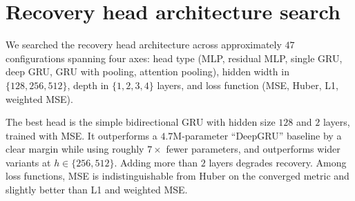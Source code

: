 \section{Recovery head architecture search}
\label{sec:appendix-head-search}

We searched the recovery head architecture across approximately $47$
configurations spanning four axes: head type (MLP, residual MLP,
single GRU, deep GRU, GRU with pooling, attention pooling), hidden
width in $\{128, 256, 512\}$, depth in $\{1, 2, 3, 4\}$ layers, and
loss function (MSE, Huber, L1, weighted MSE).

The best head is the simple bidirectional GRU with hidden size $128$
and $2$ layers, trained with MSE. It outperforms a $4.7$M-parameter
``DeepGRU'' baseline by a clear margin while using roughly $7\times$
fewer parameters, and outperforms wider variants at $h \in \{256,
512\}$. Adding more than $2$ layers degrades recovery. Among loss
functions, MSE is indistinguishable from Huber on the converged
metric and slightly better than L1 and weighted MSE.
